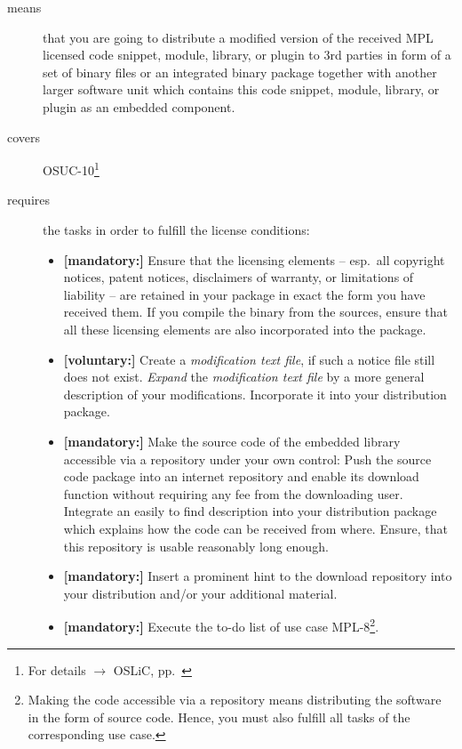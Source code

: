 \begin{description}
\item[means] that you are going to distribute a modified version of the received
MPL licensed code snippet, module, library, or plugin to 3rd parties in form
of a set of binary files or an integrated binary package together with another
larger software unit which contains this code snippet, module, library, or
plugin as an embedded component.
\item[covers] OSUC-10\footnote{For details $\rightarrow$ OSLiC, pp.\ \pageref{OSUC-10-DEF}}
\item[requires] the tasks in order to fulfill the license conditions:
\begin{itemize}

  \item \textbf{[mandatory:]} Ensure that the licensing elements -- esp.\ all
  copyright notices, patent notices, disclaimers of warranty, or limitations of
  liability -- are retained in your package in exact the form you have received
  them. If you compile the binary from the sources, ensure that all these
  licensing elements are also incorporated into the package.
  
  \item \textbf{[voluntary:]} Create a \emph{modification text file}, if such a
  notice file still does not exist. \emph{Expand} the \emph{modification text
  file} by a more general description of your modifications. Incorporate it into
  your distribution package.

  \item \textbf{[mandatory:]} Make the source code of the embedded library
  accessible via a repository under your own control: Push the source code
  package into an internet repository and enable its download function without
  requiring any fee from the downloading user. Integrate an easily to find
  description into your distribution package which explains how the code can be
  received from where. Ensure, that this repository is usable reasonably long
  enough.
  
  \item \textbf{[mandatory:]} Insert a prominent hint to the download repository
  into your distribution and/or your additional material.

  \item \textbf{[mandatory:]} Execute the to-do list of use case MPL-8\footnote{
  Making the code accessible via a repository means distributing the software in
  the form of source code. Hence, you must also fulfill all tasks of the
  corresponding use case.}.
  

\end{itemize}
\end{description}
